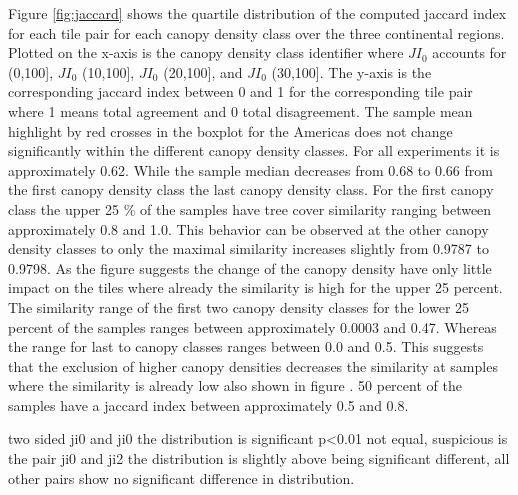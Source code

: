 			 Figure \ref{fig:jaccard} shows the quartile distribution of the computed jaccard index for each tile pair for each canopy density class over the three continental regions. Plotted on the x-axis is the canopy density class identifier where $JI_0$ accounts for (0,100], $JI_0$ (10,100], $JI_0$ (20,100], and $JI_0$ (30,100]. The y-axis is the corresponding jaccard index between 0 and 1 for the corresponding tile pair where 1 means total agreement and 0 total disagreement. The sample mean highlight by red crosses in the boxplot for the Americas does not change significantly within the different canopy density classes. For all experiments it is approximately 0.62. While the sample median decreases from 0.68 to 0.66 from the first canopy density class the last canopy density class. For the first canopy class the upper 25 \% of the samples have tree cover similarity ranging between approximately 0.8 and 1.0. This behavior can be observed at the other canopy density classes to only the maximal similarity increases slightly from 0.9787 to 0.9798. As the figure  suggests the change of the canopy density have only little impact on the tiles where already the similarity is high for the upper 25 percent. The similarity range of the first two canopy density classes for the lower 25 percent of the samples ranges between approximately 0.0003 and 0.47. Whereas the range for last to canopy classes ranges between 0.0 and 0.5. This suggests that the exclusion of higher canopy densities decreases the similarity at samples where the similarity is already low also shown in figure . 50 percent of the samples have a jaccard index between approximately 0.5 and 0.8.  
 
			two sided ji0 and ji0 the distribution is significant p<0.01 not equal, suspicious is the pair ji0 and ji2 the distribution is slightly above being significant different, all other pairs show no significant difference in distribution.



